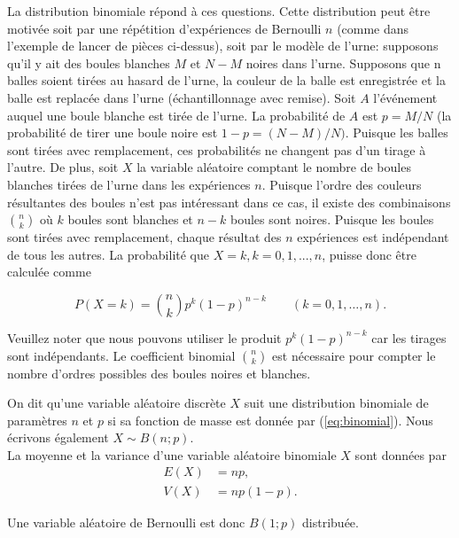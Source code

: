 {La distribution binomiale répond à ces questions. Cette distribution peut être motivée soit par une répétition
d'expériences de Bernoulli $ n $ (comme dans l'exemple de lancer de pièces ci-dessus), soit par le modèle de
l'urne: supposons qu'il y ait des boules blanches $ M $ et $ N - M $ noires dans l'urne. Supposons que n balles soient
tirées au hasard de l'urne, la couleur de la balle est enregistrée et la balle est replacée dans l'urne
(échantillonnage avec remise). Soit $ A $ l'événement auquel une boule blanche est tirée de l'urne. La probabilité
de $ A $ est $ p = M / N $ (la probabilité de tirer une boule noire est $ 1 - p = (N - M) / N) $. Puisque les balles
sont tirées avec remplacement, ces probabilités ne changent pas d'un tirage à l'autre. De plus, soit $ X $  la variable
aléatoire comptant le nombre de boules blanches tirées de l'urne dans les expériences $ n $. Puisque l'ordre des
couleurs résultantes des boules n'est pas intéressant dans ce cas, il existe des combinaisons $\binom{n}{k} $ où $ k $
boules sont blanches et $ n - k $ boules  sont noires. Puisque les boules sont tirées avec remplacement, chaque
résultat des  $ n $ expériences est indépendant de tous les autres. La probabilité que $ X = k, k = 0,1, ..., n $,
puisse donc être calculée comme

\begin{equation}\label{eq:binomial}
P(X=k)=\binom{n}{k}p^k(1-p)^{n-k} \quad\mathrm{   }\quad (k=0,1,\dots,n).
\end{equation}

Veuillez noter que nous pouvons utiliser le produit $ p^k(1-p)^{n-k} $ car les tirages sont indépendants.
Le coefficient binomial $ \binom{n}{k} $ est nécessaire pour compter le nombre d'ordres possibles des boules noires
et blanches.

\theoremstyle{definition}
\begin{definition}
    On dit qu'une variable aléatoire discrète $X$ suit une distribution binomiale de paramètres $ n $ et $ p $ si
    sa fonction de masse est donnée par (\ref{eq:binomial}). Nous écrivons également $ X \sim B (n; p) $. \\
    La moyenne et la variance d'une variable aléatoire binomiale $X$ sont données par
    \begin{align}
        E(X) &= np,\\
        V(X) &= np(1-p).
    \end{align}
\end{definition}

\begin{remark}
    Une variable aléatoire de Bernoulli est donc $B(1; p)$ distribuée.
\end{remark}

}
